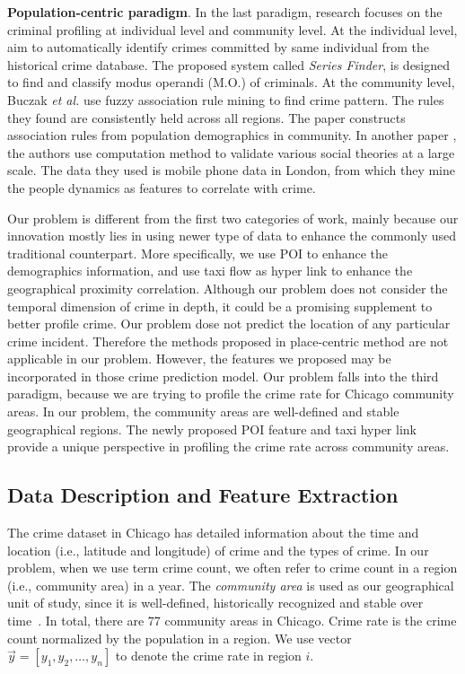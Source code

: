 \textbf{Population-centric paradigm}. In the last paradigm, research focuses on the criminal profiling at individual level and community level. At the individual level, \cite{WRWS13} aim to automatically  identify crimes committed by same individual from the historical crime database. The proposed system called \emph{Series Finder}, is designed to find and classify modus operandi (M.O.)  of criminals.  At the community level, Buczak \emph{et al.} \cite{BuGi10} use fuzzy association rule mining to find crime pattern. The rules they found are consistently held across all regions. The paper constructs association rules from population demographics in community.  In another paper \cite{TQC14}, the authors use computation method to validate various social theories at a large scale.  The data they used is mobile phone data in London, from which they mine the  people dynamics as features to correlate with crime.  


Our problem is different from the first two categories of work, mainly because our innovation mostly lies in using newer type of data to enhance the commonly used traditional counterpart. More specifically, we use POI to enhance the demographics information, and use taxi flow as hyper link to enhance the geographical proximity correlation. Although our problem does not consider the temporal dimension of crime in depth, it could be a promising supplement to better profile crime. Our problem dose not predict the location of any particular crime incident. Therefore the methods proposed in place-centric method are not applicable in our problem. However, the features we proposed may be incorporated in those crime prediction model. 
Our problem falls into the third paradigm,  because we are trying to profile the crime rate for Chicago community areas. In our problem, the community areas are well-defined and stable geographical regions. The newly proposed POI feature and taxi hyper link provide a unique perspective in profiling the crime rate across community areas.




\subsection{Data Description and Feature Extraction}

The crime dataset in Chicago has detailed information about the time and location (i.e., latitude and longitude) of crime and the types of crime. In our problem, when we use term crime count, we often refer to crime count in a  region (i.e., community area) in a year. The \emph{community area} is used as our geographical unit of study, since it is well-defined,  historically recognized and stable over time~\cite{wiki-ca}. In total, there are 77 community areas in Chicago.  Crime rate is the crime count normalized by the population in a region. We use vector $\vec{y} = [y_1, y_2, \ldots, y_n]$ to denote the crime rate in region $i$.


